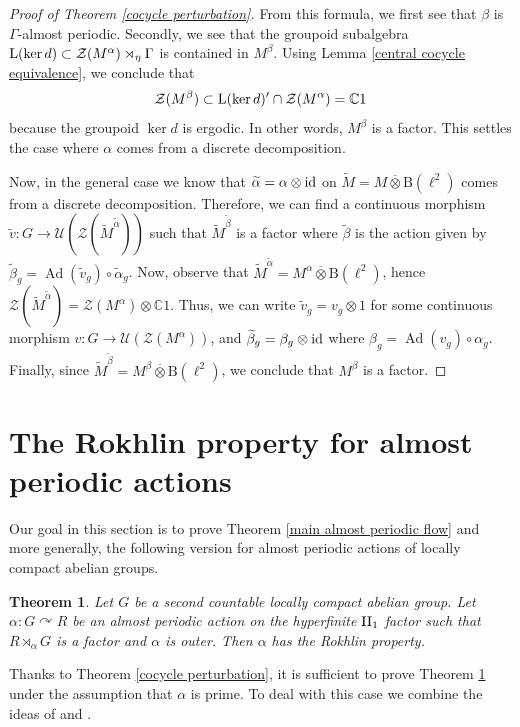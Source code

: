 \documentclass[a4paper,11pt]{amsart}
\numberwithin{equation}{section}
\newtheorem{theorem}{Theorem}[section]
\theoremstyle{definition}
\newcommand{\B}{\mathrm{B}}
\newcommand{\C}{\mathbb{C}}
\newcommand{\cZ}{\mathcal{Z}}
\newcommand{\cU}{\mathcal{U}}
\newcommand{\Ad}{\operatorname{Ad}}
\newcommand{\id}{\text{\rm id}}
\newcommand{\rL}{\mathord{\text{\rm L}}}
\newcommand{\ovt}{\mathbin{\overline{\otimes}}}
\newcommand{\II}{{\rm II}}
\begin{document}
\begin{proof}[Proof of Theorem \ref{cocycle perturbation}]
   From this formula, we first see that $\beta$ is $\Gamma$-almost periodic. Secondly, we see that the groupoid subalgebra $\rL(\ker d) \subset \cZ(M^\alpha) \rtimes_{\eta} \Gamma$ is contained in $M^\beta$. Using Lemma \ref{central cocycle equivalence}, we conclude that 
    $$\cZ(M^\beta) \subset \rL(\ker d)' \cap \cZ(M^\alpha)=\C1$$ 
    because the groupoid $\ker d$ is ergodic. In other words, $M^\beta$ is a factor. This settles the case where $\alpha$ comes from a discrete decomposition.

    Now, in the general case we know that $\widetilde{\alpha}=\alpha \otimes \id$ on $\widetilde{M}=M \ovt \B(\ell^2)$ comes from a discrete decomposition. Therefore, we can find a continuous morphism $\widetilde{v} : G \rightarrow \cU(\cZ(\widetilde{M}^{\widetilde{\alpha}}))$ such that $\widetilde{M}^{\widetilde{\beta}}$ is a factor where $\widetilde{\beta}$ is the action given by $\widetilde{\beta}_g=\Ad(\widetilde{v}_g) \circ \widetilde{\alpha}_g$. Now, observe that $\widetilde{M}^{\widetilde{\alpha}}=M^\alpha \ovt \B(\ell^2)$, hence $\cZ(\widetilde{M}^{\widetilde{\alpha}})=\cZ(M^\alpha) \otimes \C1$. Thus, we can write $\widetilde{v}_g = v_g \otimes 1$ for some continuous morphism $v : G \rightarrow \cU(\cZ(M^\alpha))$, and $\widetilde{\beta}_g=\beta_g \otimes \id$ where $\beta_g=\Ad(v_g) \circ \alpha_g$. Finally, since $\widetilde{M}^{\widetilde{\beta}}=M^\beta \ovt \B(\ell^2)$, we conclude that $M^\beta$ is a factor.
\end{proof}


\section{The Rokhlin property for almost periodic actions}

Our goal in this section is to prove Theorem \ref{main almost periodic flow} and more generally, the following version for almost periodic actions of locally compact abelian groups.
\begin{theorem} \label{almost periodic action}
     Let $G$ be a second countable locally compact abelian group. Let $\alpha : G \curvearrowright R$ be an almost periodic action on the hyperfinite $\II_1$ factor such that $R \rtimes_\alpha G$ is a factor and $\alpha$ is outer. Then $\alpha$ has the Rokhlin property.
\end{theorem}

Thanks to Theorem \ref{cocycle perturbation}, it is sufficient to prove Theorem \ref{almost periodic action} under the assumption that $\alpha$ is prime. To deal with this case we combine the ideas of \cite[Proposition 2.5]{Ki95} and \cite[Theorem 6.12]{MT12}.
\end{document}
